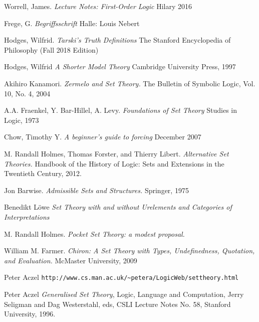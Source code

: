 \documentclass[11pt]{report}
\theoremstyle{definition}
\theoremstyle{theorem}
\theoremstyle{lemma}
\begin{document}
\begin{thebibliography}{9}
Worrell, James.
\textit{Lecture Notes: First-Order Logic}
Hilary 2016

Frege, G.
\textit{Begriffsschrift}
Halle: Louis Nebert

Hodges, Wilfrid.
\textit{Tarski's Truth Definitions}
The Stanford Encyclopedia of Philosophy (Fall 2018 Edition)

Hodges, Wilfrid
\textit{A Shorter Model Theory}
Cambridge University Press, 1997

Akihiro Kanamori.
\textit{Zermelo and Set Theory.}
The Bulletin of Symbolic Logic, Vol. 10, No. 4, 2004

A.A. Fraenkel, Y. Bar-Hillel, A. Levy.
\textit{Foundations of Set Theory}
Studies in Logic, 1973

Chow, Timothy Y.
\textit{A beginner's guide to forcing}
December 2007

M. Randall Holmes, Thomas Forster, and Thierry Libert.
\textit{Alternative Set Theories.}
Handbook of the History of Logic: Sets and Extensions in the Twentieth Century, 2012.

Jon Barwise.
\textit{Admissible Sets and Structures.}
Springer, 1975

Benedikt L\"owe
\textit{Set Theory with and without Urelements and Categories of Interpretations}

M. Randall Holmes.
\textit{Pocket Set Theory: a modest proposal.}

William M. Farmer.
\textit{Chiron: A Set Theory with Types,
Undefinedness, Quotation, and Evaluation.}
McMaster University, 2009

Peter Aczel
\verb|http://www.cs.man.ac.uk/~petera/LogicWeb/settheory.html|

Peter Aczel
\textit{Generalised Set Theory}, 
Logic, Language and Computation, Jerry Seligman and Dag Westerstahl, eds, CSLI Lecture Notes No. 58, Stanford University, 1996.
\end{thebibliography}
\end{document}

